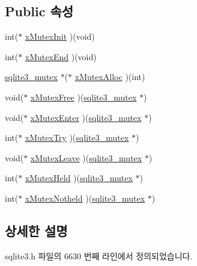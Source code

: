 \subsection*{Public 속성}
\begin{DoxyCompactItemize}
\item 
int($\ast$ \hyperlink{structsqlite3__mutex__methods_a1a163f0e0eaed85223b1537434df635a}{x\+Mutex\+Init} )(void)
\item 
int($\ast$ \hyperlink{structsqlite3__mutex__methods_ab3bc5e370edbeb1db4199d5f609fb09f}{x\+Mutex\+End} )(void)
\item 
\hyperlink{sqlite3_8h_a0f546860bde03fddb33a9fed920da05c}{sqlite3\+\_\+mutex} $\ast$($\ast$ \hyperlink{structsqlite3__mutex__methods_a1c6c36e7f710a5bb8564946595cba324}{x\+Mutex\+Alloc} )(int)
\item 
void($\ast$ \hyperlink{structsqlite3__mutex__methods_a632046a2d4a6372a567a5ac5e8175b30}{x\+Mutex\+Free} )(\hyperlink{sqlite3_8h_a0f546860bde03fddb33a9fed920da05c}{sqlite3\+\_\+mutex} $\ast$)
\item 
void($\ast$ \hyperlink{structsqlite3__mutex__methods_a0237ae1928c2edab7be16e9e007f6a02}{x\+Mutex\+Enter} )(\hyperlink{sqlite3_8h_a0f546860bde03fddb33a9fed920da05c}{sqlite3\+\_\+mutex} $\ast$)
\item 
int($\ast$ \hyperlink{structsqlite3__mutex__methods_aa65a38cee32246dc3257a80ce47be5fe}{x\+Mutex\+Try} )(\hyperlink{sqlite3_8h_a0f546860bde03fddb33a9fed920da05c}{sqlite3\+\_\+mutex} $\ast$)
\item 
void($\ast$ \hyperlink{structsqlite3__mutex__methods_a0d4ef78481d18de5f9346f80321a17b1}{x\+Mutex\+Leave} )(\hyperlink{sqlite3_8h_a0f546860bde03fddb33a9fed920da05c}{sqlite3\+\_\+mutex} $\ast$)
\item 
int($\ast$ \hyperlink{structsqlite3__mutex__methods_a71a26118133388426ddf18ab59ce87f5}{x\+Mutex\+Held} )(\hyperlink{sqlite3_8h_a0f546860bde03fddb33a9fed920da05c}{sqlite3\+\_\+mutex} $\ast$)
\item 
int($\ast$ \hyperlink{structsqlite3__mutex__methods_a5b7c9daa7aea5f01ef9fa58f6d1c5cb1}{x\+Mutex\+Notheld} )(\hyperlink{sqlite3_8h_a0f546860bde03fddb33a9fed920da05c}{sqlite3\+\_\+mutex} $\ast$)
\end{DoxyCompactItemize}


\subsection{상세한 설명}


sqlite3.\+h 파일의 6630 번째 라인에서 정의되었습니다.



